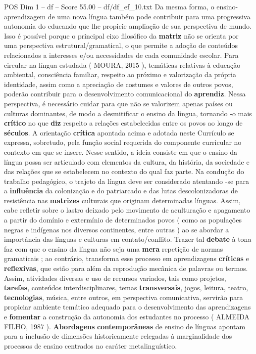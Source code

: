 \begin{textsample}{POS Dim 1 – df – Score 55.00 – df/df\_ef\_10.txt}
Da mesma forma, o ensino-aprendizagem de uma nova língua também pode contribuir para uma progressiva autonomia do educando que lhe propicie ampliação de sua perspectiva de mundo.
Isso é possível porque o principal eixo filosófico da \textbf{matriz} não se orienta por uma perspectiva estrutural/gramatical, o que permite a adoção de conteúdos relacionados a interesses e/ou necessidades de cada comunidade escolar.
Para circular na língua estudada ( MOURA, 2015 ), temáticas relativas à educação ambiental, consciência familiar, respeito ao próximo e valorização da própria identidade, assim como a apreciação de costumes e valores de outros povos, poderão contribuir para o desenvolvimento comunicacional do \textbf{aprendiz}.
Nessa perspectiva, é necessário cuidar para que não se valorizem apenas países ou culturas dominantes, de modo a desmitificar o ensino da língua, tornando -o mais \textbf{crítico} no que \textbf{diz} respeito a relações estabelecidas entre os povos ao longo de \textbf{séculos}.
A orientação \textbf{crítica} apontada acima e adotada neste Currículo se expressa, sobretudo, pela função social requerida do componente curricular no contexto em que se insere.
Nesse sentido, a ideia consiste em que o ensino da língua possa ser articulado com elementos da cultura, da história, da sociedade e das relações que se estabelecem no contexto do qual faz parte.
Na condução do trabalho pedagógico, o trajeto da língua deve ser considerado atentando -se para a \textbf{influência} da colonização e do patriarcado e das lutas descolonizadoras de resistência nas \textbf{matrizes} culturais que originam determinadas línguas.
Assim, cabe refletir sobre o lastro deixado pelo movimento de aculturação e apagamento a partir do domínio e extermínio de determinados povos ( como as populações negras e indígenas nos diversos continentes, entre outras ) ao se abordar a importância das línguas e culturas em contato/conflito.
Trazer tal \textbf{debate} à tona faz com que o ensino da língua não seja uma \textbf{mera} repetição de normas gramaticais ; ao contrário, transforma esse processo em aprendizagens \textbf{críticas} e \textbf{reflexivas}, que estão para além da reprodução mecânica de palavras ou termos.
Assim, atividades diversas e uso de recursos variados, tais como projetos, \textbf{tarefas}, conteúdos interdisciplinares, temas \textbf{transversais}, jogos, leitura, teatro, \textbf{tecnologias}, música, entre outros, em perspectiva comunicativa, servirão para propiciar ambiente temático adequado para o desenvolvimento das aprendizagens e \textbf{fomentar} a construção da autonomia dos estudantes no processo ( ALMEIDA FILHO, 1987 ). \textbf{Abordagens} \textbf{contemporâneas} de ensino de línguas apontam para a inclusão de dimensões historicamente relegadas à marginalidade dos processos de ensino centrados no caráter metalinguístico.

\end{textsample}
